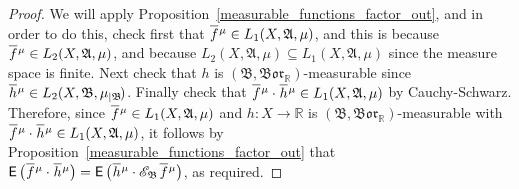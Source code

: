 \documentclass[
twoside=true,
paper=letter,
fontsize=9pt,
pagesize=auto,
leqno,
openany,
headsepline,
overfullrule,
]{scrbook}
\theoremstyle{plain}
\theoremstyle{plain}
\theoremstyle{definition}
\theoremstyle{bfnoteitalic}
\theoremstyle{bfnoteroman}
\newcommand{\sigalg}[1]{\mathfrak{#1}}
\newcommand{\cali}[1]{\mathscr{#1}}
\newcommand{\sfop}[1]{\mathsf{#1}}
\newcommand{\expval}{\sfop{E}\,}
\newcommand{\expvalof}[1]{\expval\bigl(#1\bigr)}
\newcommand{\condexpsub}[2]
{\mathop{\cali{E}\hspace{-1.5pt}}\nolimits_{#2}\hspace{-1pt}#1}
\newcommand{\borel}{\mathfrak{Bor}}
\newcommand{\restrictedto}[1]{_{\lvert#1}\kern-1.5pt}
\newcommand{\R}{\mathbb{R}}
\newcommand{\sigmaalgebra}{\sigalg{A}}
\newcommand{\sigmaalgebraii}{\sigalg{B}}
\newcommand{\funcf}{f}
\newcommand{\funch}{h}
\newcommand{\functioniii}{h}
\newcommand{\measurespace}{X}
\newcommand{\measure}{\mu}
\newcommand{\measmu}{\mu}
\newcommand*\xbar[1]{%
   \hbox{%
     \vbox{%
       \hrule height 0.4pt %
       \kern0.4ex%
       \hbox{%
         \ensuremath{#1}%
       }%
     }%
   }%
}
\newcommand{\lebclass}[1]{\hspace{.5pt}\xbar{#1}\hspace{0.5pt}}
\newcommand{\ellclass}[2]{\lebclass{#1}^{#2}}
\begin{document}
\begin{proof}
We will apply Proposition~\ref{measurable_functions_factor_out}, and in order to do this, check first that
$\ellclass{\funcf}{\measmu} \in L_1(\measurespace, \sigmaalgebra,\measure)$, and this is because
$\ellclass{\funcf}{\measmu} \in L_2(\measurespace, \sigmaalgebra,\measure)$, and because
$L_2(\measurespace, \sigmaalgebra,\measure) \subseteq
L_1(\measurespace, \sigmaalgebra,\measure)$ since the measure space is finite.
Next check that
$\funch$ is
$(\sigmaalgebraii, \borel_\R)$\hyp{}measurable
since
$\ellclass{\funch}{\measmu}\in L_2(\measurespace, \sigmaalgebraii,\measure\restrictedto{\sigmaalgebraii})$.
Finally check that
$\ellclass{\funcf}{\measmu} \cdot \ellclass{\funch}{\measmu}
\in
L_1(\measurespace, \sigmaalgebra,\measure)$ by Cauchy-Schwarz.
Therefore,
since
$\ellclass{\funcf}{\measmu} \in L_1(\measurespace, \sigmaalgebra,\measure)$ and
$\functioniii:\measurespace\to\R$ is $(\sigmaalgebraii, \borel_\R)$\hyp{}measurable with
$\ellclass{\funcf}{\measmu}
\cdot
\ellclass{\funch}{\measmu}
\in
L_1(\measurespace, \sigmaalgebra,\measure)$,
it follows by Proposition~\ref{measurable_functions_factor_out} that
$\expvalof{\ellclass{\funcf}{\measmu} \cdot \ellclass{\funch}{\measmu}}
=
\expvalof{\ellclass{\funch}{\measmu}
\cdot
\condexpsub{\ellclass{\funcf}{\measmu}}{\sigmaalgebraii}}$, as required.


\end{proof}
\end{document}

